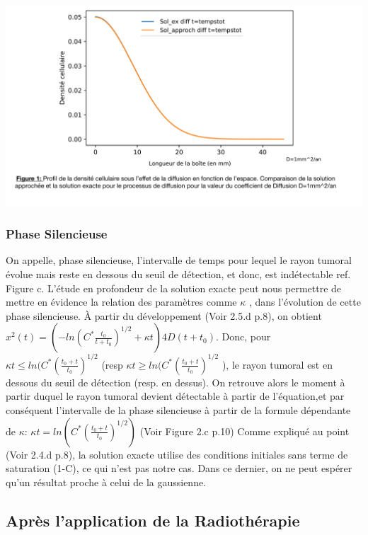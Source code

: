 \documentclass[12pt,a4paper]{article}
\begin{document}
\includegraphics[page=2,scale=0.25]{FIGURES.pdf} 
\\

\subsubsection{Phase Silencieuse}
On appelle, phase silencieuse, l'intervalle de temps pour lequel le rayon tumoral évolue mais reste en dessous du seuil de détection, et donc, est indétectable {ref. Figure c}. L'étude en profondeur de la solution exacte peut nous permettre de mettre en évidence la relation des paramètres comme $\kappa$ , dans l'évolution de cette phase silencieuse. 
À partir du développement (Voir 2.5.d p.8), on obtient $x^2(t) = (-ln(C^{*}\frac{t_0}{t + t_0})^{1/2} + \kappa t ) 4D(t+t_0)$. 
Donc, pour $\kappa t \leq ln(C^{*}(\frac{t_0 + t}{t_0})^{1/2}$ (resp $\kappa t \geq ln(C^{*}(\frac{t_0 + t}{t_0})^{1/2}$ ), le rayon tumoral est en dessous du seuil de détection (resp. en dessus). On retrouve alors le moment à partir duquel le rayon tumoral devient détectable à partir de l'équation,et par conséquent l'intervalle de la phase silencieuse à partir de la formule dépendante de $\kappa$:
$\kappa t = ln(C^{*}(\frac{t_0 + t}{t_0})^{1/2})$ (Voir Figure 2.c p.10) 
Comme expliqué au point (Voir 2.4.d p.8), la solution exacte utilise des conditions initiales sans terme de saturation (1-C), ce qui n'est pas notre cas. Dans ce dernier, on ne peut espérer qu'un résultat proche à celui de la gaussienne.  
\\
\subsection{Après l'application de la Radiothérapie}
\\
\end{document}
